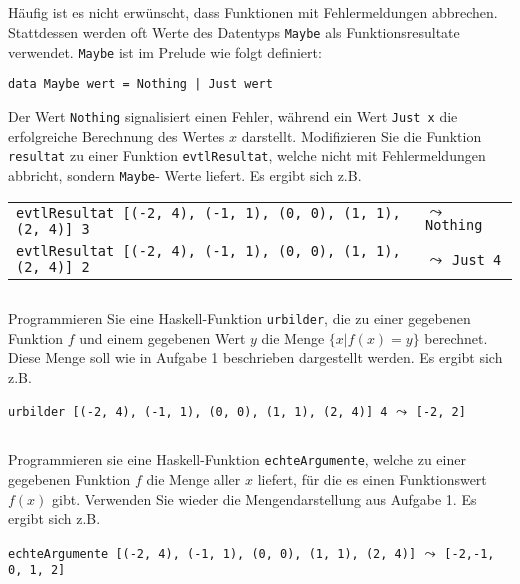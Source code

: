 \documentclass[
  10pt,                   %
  DIV12,
  german,                 %
  oneside,                %
  parskip=half,           %
  headings=normal,        %
  captions=tableheading,  %
]{scrartcl}
\begin{document}
\subsection{}
Häufig ist es nicht erwünscht, dass Funktionen mit Fehlermeldungen abbrechen.
Stattdessen werden oft Werte des Datentyps \lstinline|Maybe| als Funktionsresultate verwendet.
\lstinline|Maybe| ist im Prelude wie folgt definiert:
\begin{center}
\lstinline!data Maybe wert = Nothing | Just wert!
\end{center}

Der Wert \lstinline|Nothing| signalisiert einen Fehler, während ein Wert \lstinline|Just x| die erfolgreiche
Berechnung des Wertes $x$ darstellt. Modifizieren Sie die Funktion \lstinline|resultat| zu einer
Funktion \lstinline|evtlResultat|, welche nicht mit Fehlermeldungen abbricht, sondern \lstinline|Maybe|-
Werte liefert. Es ergibt sich z.B.
\begin{center}
\begin{tabular}{ll}
\lstinline|evtlResultat [(-2, 4), (-1, 1), (0, 0), (1, 1), (2, 4)] 3| & $\leadsto$ \lstinline|Nothing|\\
\lstinline|evtlResultat [(-2, 4), (-1, 1), (0, 0), (1, 1), (2, 4)] 2| & $\leadsto$ \lstinline|Just 4|
\end{tabular}
\end{center}
\subsection{}
Programmieren Sie eine Haskell-Funktion \lstinline|urbilder|, die zu einer gegebenen Funktion
$f$ und einem gegebenen Wert $y$ die Menge $\{x | f(x) = y\}$ berechnet. Diese Menge
soll wie in Aufgabe 1 beschrieben dargestellt werden. Es ergibt sich z.B.
\begin{center}
\lstinline|urbilder [(-2, 4), (-1, 1), (0, 0), (1, 1), (2, 4)] 4| $\leadsto$ \lstinline|[-2, 2]| 
\end{center}
\subsection{}
Programmieren sie eine Haskell-Funktion \lstinline|echteArgumente|, welche zu einer gegebenen
Funktion $f$ die Menge aller $x$ liefert, für die es einen Funktionswert $f(x)$ gibt.
Verwenden Sie wieder die Mengendarstellung aus Aufgabe 1. Es ergibt sich z.B.
\begin{center}
\lstinline|echteArgumente [(-2, 4), (-1, 1), (0, 0), (1, 1), (2, 4)]| $\leadsto$ \lstinline|[-2,-1, 0, 1, 2]|
\end{center}
\end{document}
